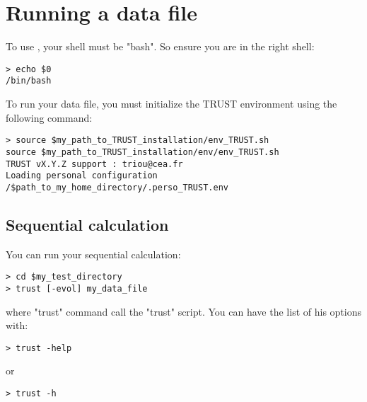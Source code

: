 \section{Running a data file}\label{Run}

To use \trust, your shell must be "bash". So ensure you are in the right shell:
\begin{verbatim}
> echo $0
/bin/bash
\end{verbatim}

To run your data file, you must initialize the TRUST environment using the following command:
\begin{verbatim}
> source $my_path_to_TRUST_installation/env_TRUST.sh
source $my_path_to_TRUST_installation/env/env_TRUST.sh
TRUST vX.Y.Z support : triou@cea.fr
Loading personal configuration /$path_to_my_home_directory/.perso_TRUST.env
\end{verbatim}


\subsection{Sequential calculation}
You can run your sequential calculation:
\begin{verbatim}
> cd $my_test_directory
> trust [-evol] my_data_file
\end{verbatim}

where "trust" command call the "trust" script.
You can have the list of his options with:
\begin{verbatim}
> trust -help
\end{verbatim}
or
\begin{verbatim}
> trust -h
\end{verbatim}

